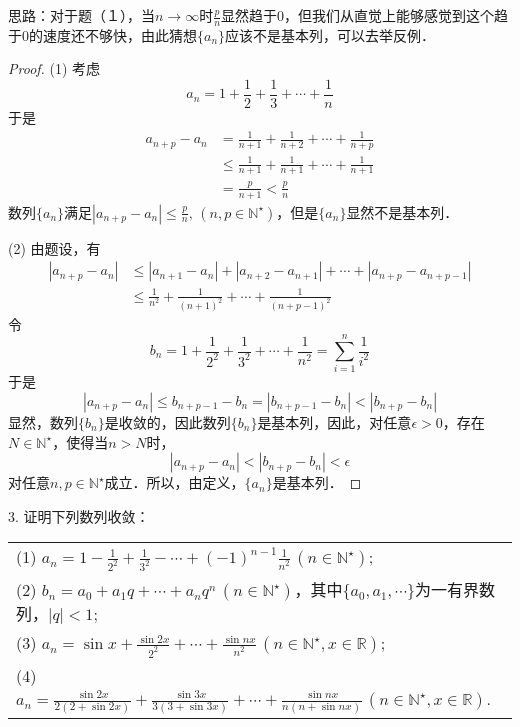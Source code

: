 思路：对于题（１），当$n\to\infty$时$\displaystyle\frac{p}{n}$显然趋于$0$，但我们从直觉上能够感觉到这个趋于$0$的速度还不够快，由此猜想$\{a_n\}$应该不是基本列，可以去举反例．
\begin{proof}
(1) 考虑
\begin{equation}
    a_n = 1 + \frac{1}{2} + \frac{1}{3} + \cdots + \frac{1}{n} 
\end{equation}
于是
\begin{align}
    a_{n+p} - a_n &= \frac{1}{n+1} + \frac{1}{n+2} + \cdots + \frac{1}{n+p}\\
    &\leq \frac{1}{n+1} + \frac{1}{n+1} + \cdots + \frac{1}{n+1} \\
    &= \frac{p}{n+1} < \frac{p}{n}
\end{align}
数列$\{a_n\}$满足$|a_{n+p}-a_n|\leq \displaystyle\frac{p}{n}, \, (n,p\in\mathbb{N}^\star)$，但是$\{a_n\}$显然不是基本列．

(2) 由题设，有
\begin{align}
    |a_{n+p} - a_n| &\leq |a_{n+1} - a_n| + |a_{n+2} - a_{n+1}| + \cdots + |a_{n+p} - a_{n+p-1}| \\
    &\leq \frac{1}{n^2} + \frac{1}{(n+1)^2} + \cdots + \frac{1}{(n+p-1)^2}
\end{align}
令
\begin{equation}
    b_n = 1 + \frac{1}{2^2} + \frac{1}{3^2} + \cdots + \frac{1}{n^2} = \sum_{i=1}^n \frac{1}{i^2}
\end{equation}
于是
\begin{equation}
    |a_{n+p} - a_n| \leq b_{n+p-1} - b_n = |b_{n+p-1} - b_n| < |b_{n+p} - b_n|
\end{equation}
显然，数列$\{b_n\}$是收敛的，因此数列$\{ b_n \}$是基本列，因此，对任意$\epsilon > 0$，存在$N \in \mathbb{N}^\star$，使得当$n > N$时，
\begin{equation}
    |a_{n+p} - a_n| < |b_{n+p} - b_n| < \epsilon
\end{equation}
对任意$n, p \in \mathbb{N}^\star$成立．所以，由定义，$\{ a_n \}$是基本列．
\end{proof}

3. 证明下列数列收敛：

\begin{table}[H]
    \centering
    \begin{tabularx}{\textwidth} { >{\raggedright\arraybackslash}X }
    (1) $\displaystyle a_n = 1-\frac{1}{2^2}+\frac{1}{3^2}-\cdots+(-1)^{n-1}\frac{1}{n^2}\, (n\in\mathbb{N}^\star)$; \\ [0.7em]
    (2) $\displaystyle b_n = a_0 + a_1 q + \cdots + a_n q^n \, (n \in \mathbb{N}^\star)$，其中$\{a_0,a_1,\cdots\}$为一有界数列，$|q|<1$; \\ [0.7em]
    (3) $a_n = \displaystyle \sin x + \frac{\sin 2x}{2^2} + \cdots + \frac{\sin nx}{n^2}\, (n \in \mathbb{N}^\star, x \in \mathbb{R})$; \\ [0.7em]
    (4) $a_n = \displaystyle \frac{\sin 2x}{2(2+\sin 2x)} + \frac{\sin 3x}{3(3+\sin 3x)} + \cdots + \frac{\sin nx}{n(n+\sin nx)} \, (n\in\mathbb{N}^\star, x \in \mathbb{R})$.
    \end{tabularx}
\end{table}

